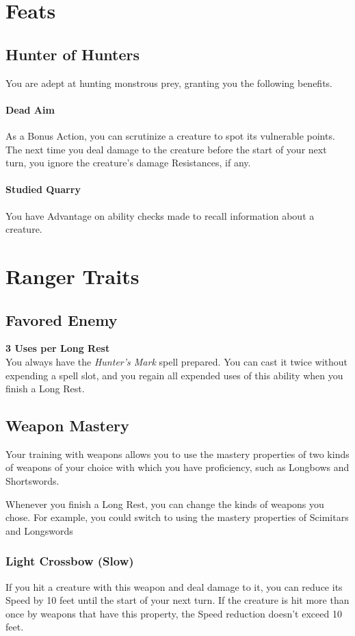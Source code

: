 \documentclass[letterpaper,openany,oneside,twocolumn]{book}
\begin{document}
\section*{Feats}
\subsection*{Hunter of Hunters}
You are adept at hunting monstrous prey, granting you the following benefits.
\paragraph*{Dead Aim} As a Bonus Action, you can scrutinize a creature to spot its vulnerable points. The next time you deal damage to the creature before the start of your next turn, you ignore the creature's damage Resistances, if any.
\paragraph*{Studied Quarry} You have Advantage on ability checks made to recall information about a creature.

\section*{Ranger Traits}
\subsection*{Favored Enemy}
\textbf{3 Uses per Long Rest}\\
You always have the \textit{Hunter's Mark} spell prepared. You can cast it twice without expending a spell slot, and you regain all expended uses of this ability when you finish a Long Rest.
\subsection*{Weapon Mastery}
Your training with weapons allows you to use the mastery properties of two kinds of weapons of your choice with which you have proficiency, such as Longbows and Shortswords.

Whenever you finish a Long Rest, you can change the kinds of weapons you chose. For example, you could switch to using the mastery properties of Scimitars and Longswords
\subsubsection*{Light Crossbow (Slow)}
If you hit a creature with this weapon and deal damage to it, you can reduce its Speed by 10 feet until the start of your next turn. If the creature is hit more than once by weapons that have this property, the Speed reduction doesn't exceed 10 feet.
\end{document}
